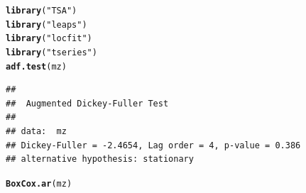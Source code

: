 \documentclass{article}\usepackage[]{graphicx}\usepackage[]{color}
\makeatletter
\newcommand{\hlstr}[1]{\textcolor[rgb]{0.192,0.494,0.8}{#1}}%
\newcommand{\hlstd}[1]{\textcolor[rgb]{0.345,0.345,0.345}{#1}}%
\newcommand{\hlkwd}[1]{\textcolor[rgb]{0.737,0.353,0.396}{\textbf{#1}}}%
\newenvironment{kframe}{%
 \def\at@end@of@kframe{}%
 \ifinner\ifhmode%
  \def\at@end@of@kframe{\end{minipage}}%
  \begin{minipage}{\columnwidth}%
 \fi\fi%
 \def\FrameCommand##1{\hskip\@totalleftmargin \hskip-\fboxsep
 \colorbox{shadecolor}{##1}\hskip-\fboxsep
     \hskip-\linewidth \hskip-\@totalleftmargin \hskip\columnwidth}%
 \MakeFramed {\advance\hsize-\width
   \@totalleftmargin\z@ \linewidth\hsize
   \@setminipage}}%
 {\par\unskip\endMakeFramed%
 \at@end@of@kframe}
\newenvironment{knitrout}{}{} %
\makeatother
\begin{document}
\begin{knitrout}
\color{fgcolor}\begin{kframe}
\begin{alltt}
\hlkwd{library}\hlstd{(}\hlstr{"TSA"}\hlstd{)}
\hlkwd{library}\hlstd{(}\hlstr{"leaps"}\hlstd{)}
\hlkwd{library}\hlstd{(}\hlstr{"locfit"}\hlstd{)}
\hlkwd{library}\hlstd{(}\hlstr{"tseries"}\hlstd{)}
\hlkwd{adf.test}\hlstd{(mz)}
\end{alltt}
\begin{verbatim}
## 
## 	Augmented Dickey-Fuller Test
## 
## data:  mz
## Dickey-Fuller = -2.4654, Lag order = 4, p-value = 0.386
## alternative hypothesis: stationary
\end{verbatim}
\begin{alltt}
\hlkwd{BoxCox.ar}\hlstd{(mz)}
\end{alltt}


{\ttfamily\noindent\color{warningcolor}{\#\# Warning in arima0(x, order = c(i, 0L, 0L), include.mean = demean): possible convergence problem: optim gave code = 1}}

{\ttfamily\noindent\color{warningcolor}{\#\# Warning in arima0(x, order = c(i, 0L, 0L), include.mean = demean): possible convergence problem: optim gave code = 1}}


\end{kframe}
\end{knitrout}
\end{document}
